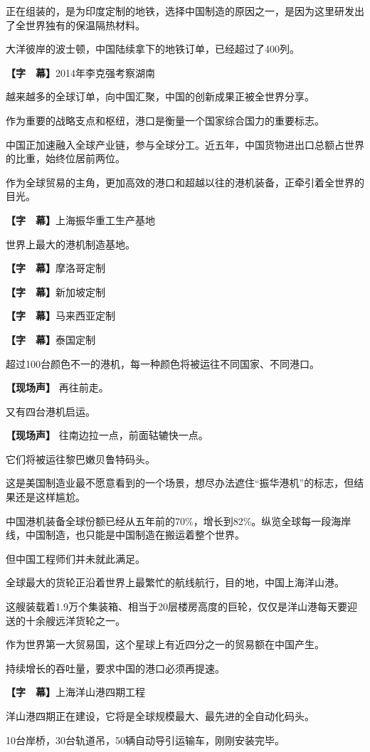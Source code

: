 \documentclass{ctexart}
\newcommand{\zkh}[1]{\textbf{\hspace{-2.7em} 【#1】}}
\begin{document}
正在组装的，是为印度定制的地铁，选择中国制造的原因之一，是因为这里研发出了全世界独有的保温隔热材料。

 大洋彼岸的波士顿，中国陆续拿下的地铁订单，已经超过了400列。

 \zkh{字　幕}2014年李克强考察湖南

 越来越多的全球订单，向中国汇聚，中国的创新成果正被全世界分享。

 作为重要的战略支点和枢纽，港口是衡量一个国家综合国力的重要标志。

中国正加速融入全球产业链，参与全球分工。近五年，中国货物进出口总额占世界的比重，始终位居前两位。

作为全球贸易的主角，更加高效的港口和超越以往的港机装备，正牵引着全世界的目光。

 \zkh{字　幕}上海振华重工生产基地

 世界上最大的港机制造基地。

 \zkh{字　幕}摩洛哥定制

 \zkh{字　幕}新加坡定制

 \zkh{字　幕}马来西亚定制

 \zkh{字　幕}泰国定制

 超过100台颜色不一的港机，每一种颜色将被运往不同国家、不同港口。

 \zkh{现场声} 再往前走。

 又有四台港机启运。

 \zkh{现场声} 往南边拉一点，前面轱辘快一点。

 它们将被运往黎巴嫩贝鲁特码头。

 
这是美国制造业最不愿意看到的一个场景，想尽办法遮住``振华港机''的标志，但结果还是这样尴尬。

中国港机装备全球份额已经从五年前的70{\%}，增长到82{\%}。纵览全球每一段海岸线，中国制造，也只能是中国制造在搬运着整个世界。

 但中国工程师们并未就此满足。

 全球最大的货轮正沿着世界上最繁忙的航线航行，目的地，中国上海洋山港。

这艘装载着1.9万个集装箱、相当于20层楼房高度的巨轮，仅仅是洋山港每天要迎送的十余艘远洋货轮之一。

 作为世界第一大贸易国，这个星球上有近四分之一的贸易额在中国产生。

 持续增长的吞吐量，要求中国的港口必须再提速。

 \zkh{字　幕}上海洋山港四期工程

 洋山港四期正在建设，它将是全球规模最大、最先进的全自动化码头。

 10台岸桥，30台轨道吊，50辆自动导引运输车，刚刚安装完毕。
\end{document}
